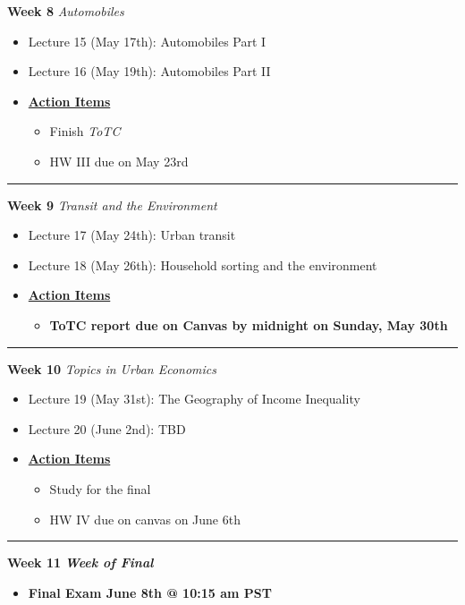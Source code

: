 \documentclass[11pt]{article}
\begin{document}
	
	\textbf{Week 8} \textit{Automobiles}
	\begin{itemize}
		\item Lecture 15 (May 17th): Automobiles Part I
		\item Lecture 16 (May 19th): Automobiles Part II
		\item[]\underline{\textbf{Action Items}}
		\begin{itemize}
			\item Finish \textit{ToTC}
			\item HW III due on May 23rd
		\end{itemize}
	\end{itemize}
	\noindent\rule[0.5ex]{\linewidth}{1pt}
	
	
	\newpage
	\textbf{Week 9} \textit{Transit and the Environment}
	
	\begin{itemize}
		\item Lecture 17 (May 24th): Urban transit 
		\item Lecture 18 (May 26th): Household sorting and the environment
		\item[]\underline{\textbf{Action Items}}
		\begin{itemize}
			\item \textbf{ToTC report due on Canvas by midnight on Sunday, May 30th}
		\end{itemize}
	\end{itemize}
	\noindent\rule[0.5ex]{\linewidth}{1pt}
	
	
	
	\textbf{Week 10} \textit{Topics in Urban Economics}
	\begin{itemize}
		\item  Lecture 19 (May 31st): The Geography of Income Inequality
		\item  Lecture 20 (June 2nd): TBD 
		\item[]\underline{\textbf{Action Items}}
		\begin{itemize}
			\item Study for the final
				\item HW IV due on canvas on June 6th
		\end{itemize}
	\end{itemize}
	\noindent\rule[0.5ex]{\linewidth}{1pt}
	
	
	
	\textbf{Week 11} \textit{\textbf{Week of Final}}

	\begin{itemize}
		\item \textbf{Final Exam June 8th @ 10:15 am PST}
	\end{itemize}
	
	
	
\end{document}
